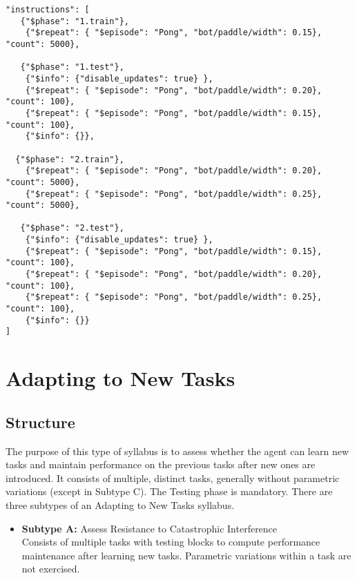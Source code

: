 \begin{small}
\begin{verbatim}
"instructions": [    
   {"$phase": "1.train"}, 
    {"$repeat": { "$episode": "Pong", "bot/paddle/width": 0.15}, "count": 5000}, 

   {"$phase": "1.test"},   
    {"$info": {"disable_updates": true} },
    {"$repeat": { "$episode": "Pong", "bot/paddle/width": 0.20}, "count": 100},  
    {"$repeat": { "$episode": "Pong", "bot/paddle/width": 0.15}, "count": 100},  
    {"$info": {}},
   
  {"$phase": "2.train"},  
    {"$repeat": { "$episode": "Pong", "bot/paddle/width": 0.20}, "count": 5000},
    {"$repeat": { "$episode": "Pong", "bot/paddle/width": 0.25}, "count": 5000},

   {"$phase": "2.test"},   
    {"$info": {"disable_updates": true} },
    {"$repeat": { "$episode": "Pong", "bot/paddle/width": 0.15}, "count": 100},
    {"$repeat": { "$episode": "Pong", "bot/paddle/width": 0.20}, "count": 100},  
    {"$repeat": { "$episode": "Pong", "bot/paddle/width": 0.25}, "count": 100},  
    {"$info": {}}
]
\end{verbatim}
\end{small}

\section{Adapting to New Tasks}
\subsection*{Structure}

The purpose of this type of syllabus is to assess whether the agent can learn new tasks and maintain performance on the previous tasks after new ones are introduced. It consists of multiple, distinct tasks, generally without parametric variations (except in Subtype C). The Testing phase is mandatory. There are three subtypes of an Adapting to New Tasks syllabus.

\begin{itemize}
    \item \textbf{Subtype A:} Assess Resistance to Catastrophic Interference\\
        Consists of multiple tasks with testing blocks to compute performance maintenance after learning new tasks. Parametric variations within a task are not exercised.\\
\end{itemize}

